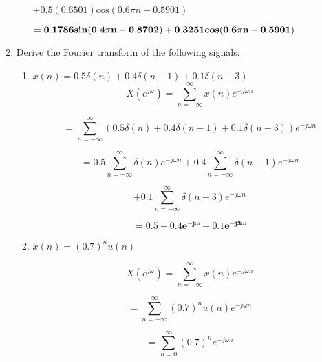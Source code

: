 \documentclass[fleqn]{article}
\begin{document}
\begin{enumerate}[nolistsep]
\begin{enumerate}[nolistsep]
				$ + 0.5(0.6501)\text{cos}(0.6{\pi}n - 0.5901)$
				
				$ \mathbf{= 0.1786\text{\textbf{sin}}(0.4{\pi}n - 0.8702) + 0.3251\text{\textbf{cos}}(0.6{\pi}n - 0.5901)}$
		\end{enumerate}
		\item Derive the Fourier transform of the following signals:
		
			\begin{enumerate}[nolistsep]
				\item $x(n) = 0.5\delta(n) + 0.4\delta(n-1) + 0.1\delta(n-3)$
					\begin{equation*}
						X(e^{j\omega}) = \sum_{n=-\infty}^{\infty}x(n)e^{-j{\omega}n}
					\end{equation*}
					
					\begin{equation*}
						= \sum_{n=-\infty}^{\infty}(0.5\delta(n) + 0.4\delta(n-1) + 0.1\delta(n-3))e^{-j{\omega}n}
					\end{equation*}
					
					\begin{equation*}
						= 0.5\sum_{n=-\infty}^{\infty}\delta(n)e^{-j{\omega}n} + 0.4\sum_{n=-\infty}^{\infty}\delta(n-1)e^{-j{\omega}n}
					\end{equation*}
					
					\begin{equation*}
						 + 0.1\sum_{n=-\infty}^{\infty}\delta(n-3)e^{-j{\omega}n}
					\end{equation*}
					
					\begin{equation*}
						\mathbf{= 0.5 + 0.4e^{-j\omega} + 0.1e^{-j3\omega}}
					\end{equation*}
					
				\item $x(n) = (0.7)^{n}u(n)$
				
					\begin{equation*}
						X(e^{j\omega}) = \sum_{n=-\infty}^{\infty}x(n)e^{-j{\omega}n}
					\end{equation*}
					
					\begin{equation*}
						= \sum_{n=-\infty}^{\infty}(0.7)^{n}u(n)e^{-j{\omega}n}
					\end{equation*}
					
					\begin{equation*}
						= \sum_{n=0}^{\infty}(0.7)^{n}e^{-j{\omega}n}
					\end{equation*}
					

\end{enumerate}
\end{enumerate}
\end{document}
